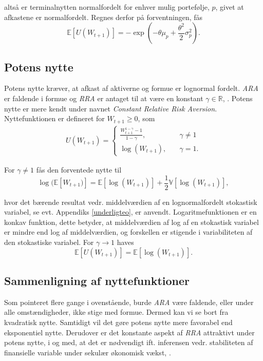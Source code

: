 \documentclass[
  a4paper,
  oneside]{memoir}
\begin{document}
altså er terminalnytten normalfordelt for enhver mulig portefølje, \(p\), givet at afkastene er normalfordelt. Regnes derfor på forventningen, fås
\[\mathbb{E}[U(W_{t+1})]=-\exp\left(-\theta\mu_p+\frac{\theta^2}{2}\sigma_p^2\right).\]

\hypertarget{potens-nytte}{%
\subsection{Potens nytte}\label{potens-nytte}}

Potens nytte kræver, at afkast af aktiverne og formue er lognormal fordelt. \emph{ARA} er faldende i formue og \emph{RRA} er antaget til at være en konstant \(\gamma\in\mathbb{R}\), \citep{CampVic2003}. Potens nytte er mere kendt under navnet \emph{Constant Relative Risk Aversion}. Nyttefunktionen er defineret for \(W_{t+1}\geq 0\), som
\begin{align}
U(W_{t+1})=\begin{cases} \frac{W_{t+1}^{1-\gamma}-1}{1-\gamma},\quad &\gamma\neq 1\\
\log(W_{t+1}),\quad &\gamma = 1. \end{cases} \label{eq:Potnytte}
\end{align}

For \(\gamma\neq 1\) fås den forventede nytte til
\[\log(\mathbb{E}[W_{t+1})]=\mathbb{E}\left[\log(W_{t+1})\right]+\frac{1}{2}\mathbb{V}\left[\log(W_{t+1})\right],\]

hvor det bærende resultat vedr. middelværdien af en lognormalfordelt stokastisk variabel, se evt. Appendiks \ref{underligteo}, er anvendt. Logaritmefunktionen er en konkav funktion, dette betyder, at middelværdien af log af en stokastisk variabel er mindre end log af middelværdien, og forskellen er stigende i variabiliteten af den stokastiske variabel. For \(\gamma \rightarrow 1\) haves
\[\mathbb{E}\left[U(W_{t+1})\right]=\mathbb{E}\left[\log(W_{t+1})\right].\]

\hypertarget{sammenligning-af-nyttefunktioner}{%
\subsection{Sammenligning af nyttefunktioner}\label{sammenligning-af-nyttefunktioner}}

Som pointeret flere gange i ovenstående, burde \emph{ARA} være faldende, eller under alle omstændigheder, ikke stige med formue. Dermed kan vi se bort fra kvadratisk nytte. Samtidigt vil det gøre potens nytte mere favorabel end eksponentiel nytte. Derudover er det konstante aspekt af \emph{RRA} attraktivt under potens nytte, i og med, at det er nødvendigt ift. inferensen vedr. stabiliteten af finansielle variable under sekulær økonomisk vækst, \citep{CampVic2003}.
\end{document}
